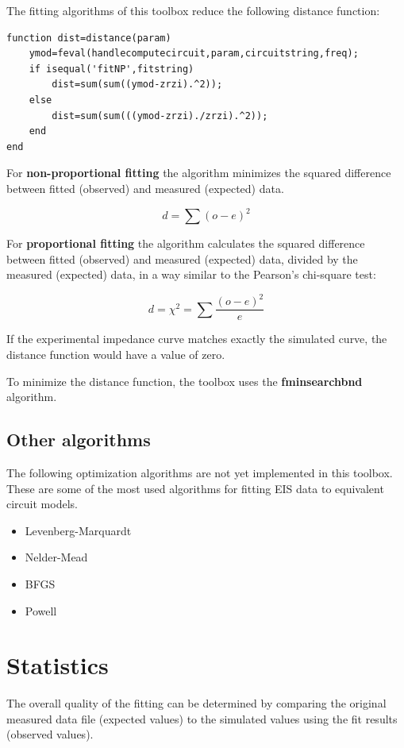 \documentclass[10pt,a4paper,oneside]{book}
\begin{document}
The fitting algorithms of this toolbox reduce the following distance function:


\begin{verbatim}
function dist=distance(param)
    ymod=feval(handlecomputecircuit,param,circuitstring,freq);
    if isequal('fitNP',fitstring)
        dist=sum(sum((ymod-zrzi).^2));
    else
        dist=sum(sum(((ymod-zrzi)./zrzi).^2));  
    end
end
\end{verbatim}


For \textbf{non-proportional fitting} the algorithm minimizes the squared difference between fitted (observed) and measured (expected) data.

\[ d = \sum(o-e)^2 \]

For \textbf{proportional fitting} the algorithm calculates the squared difference between fitted (observed) and measured (expected) data, divided by the measured (expected) data, in a way similar to the Pearson's chi-square test:

\[ d = \chi^2 = \sum \dfrac{(o-e)^2}{e} \]

If the experimental impedance curve matches exactly the simulated curve, the distance function would have a value of zero.

To minimize the distance function, the toolbox uses the \textbf{fminsearchbnd} algorithm.



\section{Other algorithms}

The following optimization algorithms are not yet implemented in this toolbox. These are some of the most used algorithms for fitting EIS data to equivalent circuit models.

\begin{itemize}
	\item Levenberg-Marquardt
	\item Nelder-Mead
	\item BFGS
	\item Powell
\end{itemize}



\chapter{Statistics}

The overall quality of the fitting can be determined by comparing the original measured data file (expected values) to the simulated values using the fit results (observed values).
\end{document}
